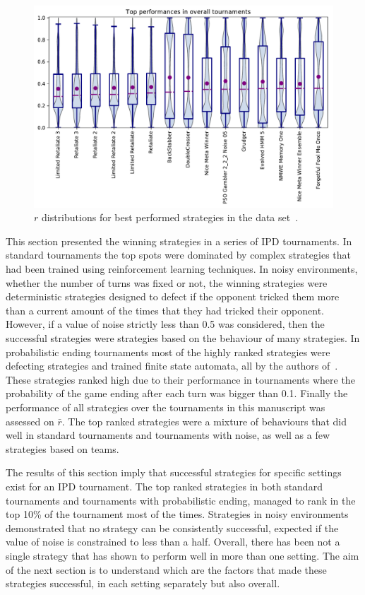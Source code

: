 \documentclass{article}
\newcommand{\numberofalltournaments}{}
\newcommand{\numberofstrategies}{}
\begin{document}
\begin{figure}[!htbp]
    \centering
    \includegraphics[width=.7\textwidth]{../images/performance_merged.pdf}
    \caption{\(r\) distributions for best performed strategies in the data set~\cite{data}.}
    \label{fig:overall_results}
\end{figure}

This section presented the winning strategies in a series of IPD tournaments. In
standard tournaments the top spots were dominated by complex strategies that had
been trained using reinforcement learning techniques. In noisy environments,
whether the number of turns was fixed or not, the winning strategies were
deterministic strategies designed to defect if the opponent tricked them more
than a current amount of the times that they had tricked their opponent. However,
if a value of noise strictly less than 0.5 was considered, then the successful
strategies were strategies based on the behaviour of many strategies. In
probabilistic ending tournaments most of the highly ranked strategies were defecting
strategies and trained finite state automata, all by the authors of~\cite{Ashlock2006, Ashlock2014}.
These strategies ranked high due to their performance in tournaments where the probability of the game ending after
each turn was bigger than 0.1.
Finally the performance of all \numberofstrategies
strategies over the \numberofalltournaments tournaments in this manuscript was
assessed on \(\bar{r}\). The top ranked strategies were a mixture of behaviours
that did well in standard tournaments and tournaments with noise, as well as a
few strategies based on teams.

The results of this section imply that successful strategies for specific
settings exist for an IPD tournament. The top ranked strategies in both standard
tournaments and tournaments with probabilistic ending, managed to rank in the
top 10\% of the tournament most of the times.
Strategies in noisy
environments demonstrated that no strategy can be consistently
successful, expected if the value of noise is constrained to less than a half.
Overall, there has been not a single strategy that has shown to perform well in
more than one setting. The aim of the next section is to understand which are
the factors that made these strategies successful, in each setting separately
but also overall.
\end{document}
